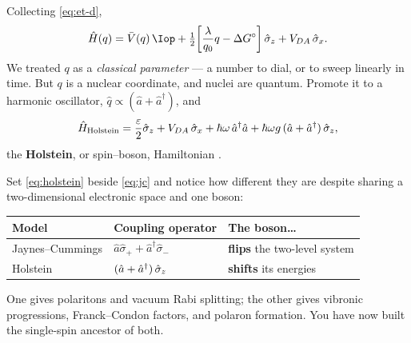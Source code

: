 \begin{lookahead}
Collecting \cref{eq:et-d},
\begin{equation}
\Hop(q) = \bar{V}(q)\,\Iop
 + \half\!\left[\frac{\lambda}{q_0}q - \Delta G^\circ\right]\szo + V_{DA}\,\sxo .
\end{equation}
We treated $q$ as a \emph{classical parameter} --- a number to dial, or to sweep linearly
in time. But $q$ is a nuclear coordinate, and nuclei are quantum. Promote it to a
harmonic oscillator, $\hat{q}\propto(\hat{a}+\hat{a}^\dagger)$, and
\begin{equation}
\hat{H}_{\rm Holstein} = \frac{\varepsilon}{2}\hat{\sigma}_z + V_{DA}\,\hat{\sigma}_x
  + \hbar\omega\,\hat{a}^\dagger\hat{a}
  + \hbar\omega g\,(\hat{a}+\hat{a}^\dagger)\,\hat{\sigma}_z ,
\label{eq:holstein}
\end{equation}
the \textbf{Holstein}, or spin--boson, Hamiltonian \cite{Holstein1959,Leggett1987}.

Set \cref{eq:holstein} beside \cref{eq:jc} and notice how different they are despite
sharing a two-dimensional electronic space and one boson:
\begin{center}
\small
\begin{tabular}{@{}lll@{}}
\toprule
Model & Coupling operator & The boson\ldots \\
\midrule
Jaynes--Cummings & $\hat{a}\hat\sigma_+ + \hat{a}^\dagger\hat\sigma_-$
  & \textbf{flips} the two-level system \\
Holstein & $(\hat{a}+\hat{a}^\dagger)\,\hat{\sigma}_z$
  & \textbf{shifts} its energies \\
\bottomrule
\end{tabular}
\end{center}
One gives polaritons and vacuum Rabi splitting; the other gives vibronic progressions,
Franck--Condon factors, and polaron formation. You have now built the single-spin
ancestor of both.
\end{lookahead}
